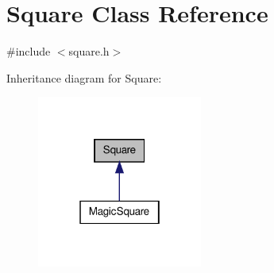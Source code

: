 \hypertarget{classSquare}{\section{Square Class Reference}
\label{classSquare}
}


{\ttfamily \#include $<$square.\-h$>$}



Inheritance diagram for Square\-:\nopagebreak
\begin{figure}[H]
\begin{center}
\leavevmode
\includegraphics[width=154pt]{classSquare__inherit__graph}
\end{center}
\end{figure}
